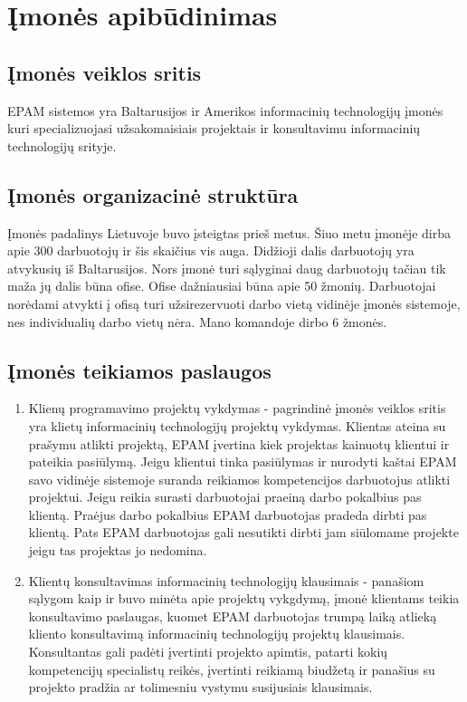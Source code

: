 \documentclass{VUMIFPSkursinis}
\begin{document}
\section{Įmonės apibūdinimas}
	\subsection{Įmonės veiklos sritis}
		EPAM sistemos yra Baltarusijos ir Amerikos informacinių technologijų įmonės kuri specializuojasi užsakomaisiais
		projektais ir konsultavimu informacinių technologijų srityje. 		
		
	\subsection{Įmonės organizacinė struktūra}
		Įmonės padalinys Lietuvoje buvo įsteigtas prieš metus. 
		Šiuo metu įmonėje dirba apie 300 darbuotojų ir šis skaičius vis auga. 
		Didžioji dalis darbuotojų yra atvykusių iš Baltarusijos.
		Nors įmonė turi sąlyginai daug darbuotojų tačiau tik maža jų dalis būna ofise.
		Ofise dažniausiai būna apie 50 žmonių.
		Darbuotojai norėdami atvykti į ofisą turi užsirezervuoti darbo vietą vidinėje įmonės sistemoje, nes individualių
		darbo vietų nėra.
		Mano komandoje dirbo 6 žmonės.
		
	\subsection{Įmonės teikiamos paslaugos}
		\begin{enumerate}
			\item{
			Klienų programavimo projektų vykdymas - pagrindinė įmonės veiklos sritis yra klietų informacinių technologijų
		projektų vykdymas. Klientas ateina su prašymu atlikti projektą, EPAM įvertina kiek projektas kainuotų klientui
			ir pateikia pasiūlymą. Jeigu klientui tinka pasiūlymas ir nurodyti kaštai EPAM savo vidinėje sistemoje 
			suranda reikiamos kompetencijos darbuotojus atlikti projektui. Jeigu reikia surasti darbuotojai praeiną
			darbo pokalbius pas klientą.
			Praėjus darbo pokalbius EPAM darbuotojas pradeda dirbti pas klientą.
			Pats EPAM darbuotojas gali nesutikti dirbti jam siūlomame projekte jeigu tas projektas jo nedomina.
			}
			
			\item{
			Klientų konsultavimas informacinių technologijų klausimais - panašiom sąlygom kaip ir buvo minėta apie
			projektų vykgdymą, įmonė klientams teikia konsultavimo paslaugas, kuomet EPAM darbuotojas trumpą laiką
			atlieką kliento konsultavimą informacinių technologijų projektų klausimais.
			Konsultantas gali padėti įvertinti projekto apimtis, patarti kokių kompetencijų specialistų reikės,
			įvertinti reikiamą biudžetą ir panašius su projekto pradžia ar tolimesniu vystymu susijusiais klausimais.		
			}
		\end{enumerate}
\end{document}
